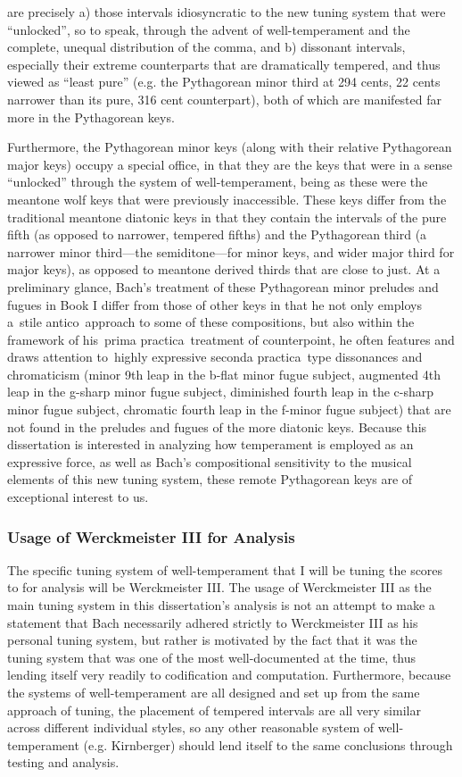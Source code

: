 are precisely a) those intervals idiosyncratic to the new tuning system
that were ``unlocked'', so to speak, through the advent of
well-temperament and the complete, unequal distribution of the comma,
and b) dissonant intervals, especially their extreme counterparts that
are dramatically tempered, and thus viewed as ``least pure'' (e.g. the
Pythagorean minor third at 294 cents, 22 cents narrower than its pure,
316 cent counterpart), both of which are manifested far more in the
Pythagorean keys.

Furthermore, the Pythagorean minor keys (along with their relative
Pythagorean major keys) occupy a special office, in that they are the
keys that were in a sense ``unlocked'' through the system of
well-temperament, being as these were the meantone wolf keys that were
previously inaccessible. These keys differ from the traditional meantone
diatonic keys in that they contain the intervals of the pure fifth (as
opposed to narrower, tempered fifths) and the Pythagorean third (a
narrower minor third---the semiditone---for minor keys, and wider major
third for major keys), as opposed to meantone derived thirds that are
close to just. At a preliminary glance, Bach's treatment of these
Pythagorean minor preludes and fugues in Book I differ from those of
other keys in that he not only employs a~stile antico~approach to some
of these compositions, but also within the framework of his~prima
practica~treatment of counterpoint, he often features and draws
attention to~highly expressive seconda practica~type dissonances and
chromaticism (minor 9th leap in the b-flat minor fugue subject,
augmented 4th leap in the g-sharp minor fugue subject, diminished fourth
leap in the c-sharp minor fugue subject, chromatic fourth leap in the
f-minor fugue subject) that are not found in the preludes and fugues of
the more diatonic keys. Because this dissertation is interested in
analyzing how temperament is employed as an expressive force, as well as
Bach's compositional sensitivity to the musical elements of this new
tuning system, these remote Pythagorean keys are of exceptional interest
to us.

\subsubsection{Usage of Werckmeister III for
Analysis}\label{usage-of-werckmeister-iii-for-analysis}

The specific tuning system of well-temperament that I will be tuning the
scores to for analysis will be Werckmeister III. The usage of
Werckmeister III as the main tuning system in this dissertation's
analysis is not an attempt to make a statement that Bach necessarily
adhered strictly to Werckmeister III as his personal tuning system, but
rather is motivated by the fact that it was the tuning system that was
one of the most well-documented at the time, thus lending itself very
readily to codification and computation. Furthermore, because the
systems of well-temperament are all designed and set up from the same
approach of tuning, the placement of tempered intervals are all very
similar across different individual styles, so any other reasonable
system of well-temperament (e.g. Kirnberger) should lend itself to the
same conclusions through testing and analysis.

